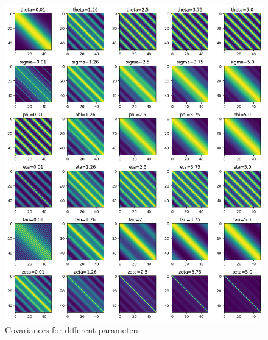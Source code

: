 \documentclass[12pt]{article}
\begin{document}
\begin{figure}[h]
\begin{minipage}{.5\textwidth}
\includegraphics[scale = 0.35]{outputs/q2/c-parameter-grams}
\caption{Covariances for different parameters}
\label{fig:fig2-c-parameter-grams}
\end{minipage}
\end{figure}
\end{document}
